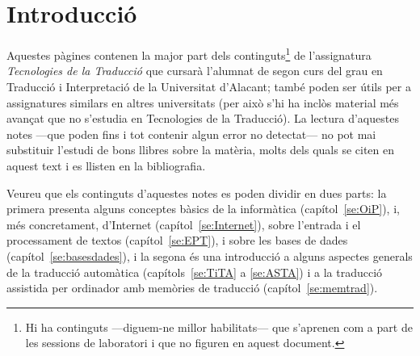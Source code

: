 \chapter{Introducció}


Aquestes pàgines contenen la major part dels continguts\footnote{Hi ha
  continguts ---diguem-ne millor habilitats--- que s'aprenen com a
  part de les sessions de laboratori i que no figuren en aquest
  document.} de l'assignatura \emph{Tecnologies de la Traducció} que
cursarà l'alumnat de segon curs del grau en Traducció i Interpretació
de la Universitat d'Alacant; també poden ser útils per a assignatures
similars en altres universitats (per això s'hi ha inclòs material més
avançat que no s'estudia en Tecnologies de la Traducció).  La lectura
d'aquestes notes ---que poden fins i tot contenir algun error no
detectat--- no pot mai substituir l'estudi de bons llibres sobre la
matèria, molts dels quals se citen en aquest text i es llisten en la
bibliografia.
  
Veureu que els continguts d'aquestes notes es poden dividir en dues
parts: la primera presenta alguns conceptes bàsics de la informàtica
(capítol~\ref{se:OiP}), i, més concretament, d'Internet
(capítol~\ref{se:Internet}), sobre l'entrada i el processament de
textos (capítol~\ref{se:EPT}), i sobre les bases de dades
(capítol~\ref{se:basesdades}), i la segona és una introducció a alguns
aspectes generals de la traducció automàtica (capítols~\ref{se:TiTA} a
\ref{se:ASTA}) i a la traducció assistida per ordinador amb memòries
de traducció (capítol~\ref{se:memtrad}).
  
